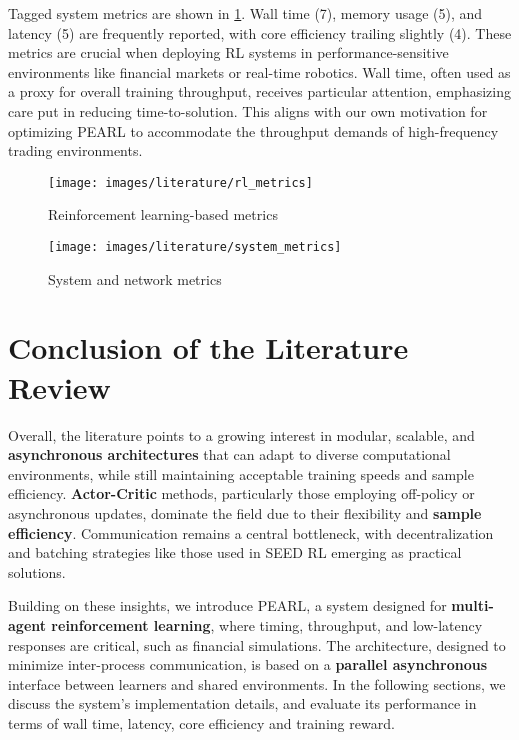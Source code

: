 Tagged system metrics are shown in \cref{fig:system_metrics}.
Wall time (7), memory usage (5), and latency (5) are frequently reported, with core efficiency trailing slightly (4).
These metrics are crucial when deploying RL systems in performance-sensitive environments like financial markets or real-time robotics.
Wall time, often used as a proxy for overall training throughput, receives particular attention,
emphasizing care put in reducing time-to-solution.
This aligns with our own motivation for optimizing PEARL to accommodate the throughput demands of high-frequency trading environments.

\begin{figure}[htbp]
    \centering
    \begin{minipage}[t]{0.48\textwidth}
        \centering
        \texttt{[image: images/literature/rl\_metrics]}
        \caption{Reinforcement learning-based metrics}
        \label{fig:rl_metrics}
    \end{minipage}
    \hfill
    \begin{minipage}[t]{0.48\textwidth}
        \centering
        \texttt{[image: images/literature/system\_metrics]}
        \caption{System and network metrics}
        \label{fig:system_metrics}
    \end{minipage}
\end{figure}

\section{Conclusion of the Literature Review}
\label{sec:conclusion-of-the-literature-review}

Overall, the literature points to a growing interest in modular, scalable, and \textbf{asynchronous architectures} that can adapt to diverse computational environments,
while still maintaining acceptable training speeds and sample efficiency.
\textbf{Actor-Critic} methods, particularly those employing off-policy or asynchronous updates, dominate the field due to their flexibility and \textbf{sample efficiency}.
Communication remains a central bottleneck, with decentralization and batching strategies like those used in SEED RL emerging as practical solutions.

Building on these insights, we introduce PEARL, a system designed for \textbf{multi-agent reinforcement learning}, where
timing, throughput, and low-latency responses are critical, such as financial simulations.
The architecture, designed to minimize inter-process communication,
is based on a \textbf{parallel asynchronous} interface between learners and shared environments.
In the following sections, we discuss the system's implementation details,
and evaluate its performance in terms of wall time, latency, core efficiency and training reward.